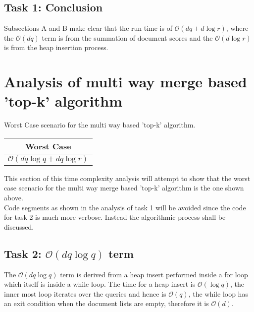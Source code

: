 \documentclass[%
 aip,
 jmp,%
 amsmath,amssymb,
 reprint,%
]{revtex4-1}
\begin{document}
\subsection{\label{sec:level4}Task 1: Conclusion}

\begin{center}
    Subsections A and B make clear that the run time
    is of $\mathcal{O}(dq + d\log{}r)$, where the $\mathcal{O}(dq)$
    term is from the summation of document scores and the 
    $\mathcal{O}(d\log{}r)$ is from the heap insertion process.
\end{center}


\section{\label{sec1:level1} Analysis of multi way merge based 'top-k' algorithm}

\begin{center}
    Worst Case scenario for the multi way based 'top-k' algorithm. \\
    
    \begin{tabular}{|c|} 
        \hline
            Worst Case \\ [0.5ex] 
            \hline
            $\mathcal{O}(dq\log{}q + dq\log{}r)$ \\ 
            \hline
    \end{tabular}
    
    \vspace{2.5mm}
    This section of this time complexity analysis will attempt to show that the
    worst case scenario for the multi way merge based 'top-k' algorithm is the one shown above. \\
    \vspace{3mm}
    Code segments as shown in the analysis of task 1 will be avoided since the code 
for task 2 is much more verbose. Instead the algorithmic process shall be discussed.
\end{center}

\subsection{\label{sec1:level2}Task 2: $\mathcal{O}(dq\log{}q )$ term}

\begin{center}
The $\mathcal{O}(dq\log{}q )$ term is derived from a heap insert performed inside a for loop which itself is inside a while loop. The time for a heap insert is $\mathcal{O}(\log{}q )$, the inner most loop iterates over the queries and hence is $\mathcal{O}(q)$, the while loop has an exit condition when the document lists are empty, therefore it is $\mathcal{O}(d)$.
\end{center}
\end{document}

